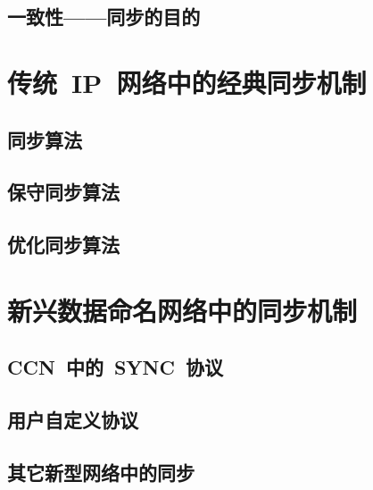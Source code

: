 \subsection{一致性——同步的目的}
\label{def}



\section{传统~IP~网络中的经典同步机制}
\label{traditional}

\subsection{同步算法}

\subsection{保守同步算法}

\subsection{优化同步算法}



\section{新兴数据命名网络中的同步机制}
\label{innovative}

\subsection{CCN~中的~SYNC~协议}

\subsection{用户自定义协议}

\subsection{其它新型网络中的同步}

